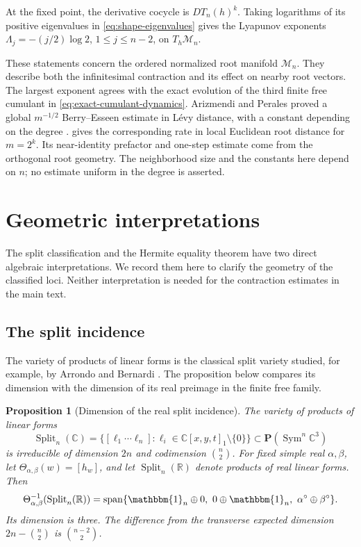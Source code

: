 \documentclass[12pt,reqno]{amsart}
\newtheorem{proposition}[proposition]{Proposition}
\theoremstyle{definition}
\theoremstyle{remark}
\newcommand{\R}{\mathbb R}
\newcommand{\C}{\mathbb C}
\newcommand{\one}{\mathbbm{1}_n}
\newcommand{\cM}{\mathcal M}
\begin{document}
At the fixed point, the derivative cocycle is \(DT_n(h)^k\).
Taking logarithms of its positive eigenvalues in
\eqref{eq:shape-eigenvalues} gives the Lyapunov exponents
\(\Lambda_j=-(j/2)\log2\), \(1\leq j\leq n-2\), on
\(T_h\cM_n\).

These statements concern the ordered normalized root manifold \(\cM_n\).
They describe both the infinitesimal contraction and its effect on nearby
root vectors.  The largest exponent agrees with the exact evolution of the
third finite free cumulant in \eqref{eq:exact-cumulant-dynamics}.
Arizmendi and Perales proved a global \(m^{-1/2}\) Berry--Esseen estimate
in L\'evy distance, with a constant depending on the degree
\cite{AP20BerryEsseen}.   gives
the corresponding rate in local Euclidean root distance for \(m=2^k\).
Its near-identity prefactor and one-step estimate come from the orthogonal
root geometry.  The neighborhood size and the constants here depend on
\(n\); no estimate uniform in the degree is asserted.

\section{Geometric interpretations}\label{sec:discriminant-geometry}

The split classification and the Hermite equality theorem have two direct
algebraic interpretations.  We record them here to clarify the geometry
of the classified loci.  Neither interpretation is needed for the
contraction estimates in the main text.

\subsection{The split incidence}
The variety of products of linear forms is the classical split
variety studied, for example, by Arrondo and Bernardi \cite{ArrondoBernardi11}. The proposition below compares its dimension with the dimension of its real preimage in the finite free family.

\begin{proposition}[Dimension of the real split incidence]
\label{prop:split-excess}
The variety of products of linear forms
\begin{equation}\label{eq:split-chow-variety}
 \operatorname{Split}_n(\C)
 =\{[\ell_1\cdots\ell_n]:\ell_i\in\C[x,y,t]_1\setminus\{0\}\}
 \subset\mathbf P(\operatorname{Sym}^n\C^3)
\end{equation}
is irreducible of dimension \(2n\) and codimension \(\binom n2\).
For fixed simple real \(\alpha,\beta\), let
\(\Theta_{\alpha,\beta}(w)=[h_w]\), and let
\(\operatorname{Split}_n(\R)\) denote products of real linear forms.
Then
\begin{equation}\label{eq:real-split-fiber}
 \Theta_{\alpha,\beta}^{-1}(\operatorname{Split}_n(\R))
 =\operatorname{span}\{\one\oplus0,\ 0\oplus\one,\
                         \alpha^\circ\oplus\beta^\circ\}.
\end{equation}
Its dimension is three.  The difference from the transverse expected
dimension \(2n-\binom n2\) is \(\binom{n-2}{2}\).
\end{proposition}
\end{document}
